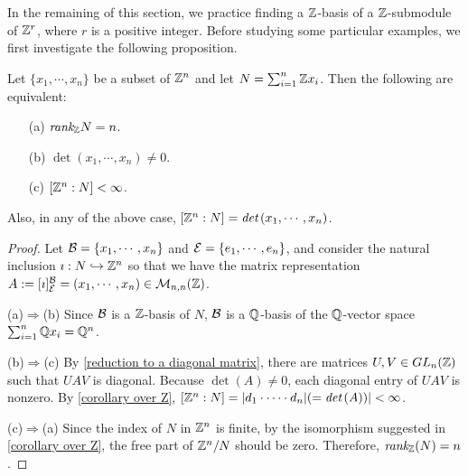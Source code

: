 In the remaining of this section, we practice finding a ${\mathbb{Z}}$-basis of a ${\mathbb{Z}}$-submodule of ${\mathbb{Z}}^r$, where $r$ is a positive integer.
Before studying some particular examples, we first investigate the following proposition.
\begin{prop}
    Let $\{x_1, \cdots, x_n\}$ be a subset of ${\mathbb{Z}}^n$ and let $N=\sum_{i=1}^n {\mathbb{Z}}x_i$.
    Then the following are equivalent:
    \begin{enumerate}
        \item[(a)]
        {
            $\textit{rank}_{\mathbb{Z}} N=n$.
        }
        \item[(b)]
        {
            $\det(x_1, \cdots, x_n)\neq 0$.
        }
        \item[(c)]
        {
            $[{\mathbb{Z}}^n: N]<\infty$.
        }
    \end{enumerate}
    Also, in any of the above case, $[{\mathbb{Z}}^n: N]=\textit{det\,}(x_1, \cdots, x_n)$.
\end{prop}
\begin{proof}
    Let ${\mathcal{B}}=\{x_1, \cdots, x_n\}$ and ${\mathcal{E}}=\{e_1, \cdots, e_n\}$, and consider the natural inclusion $\imath: N\hookrightarrow{\mathbb{Z}}^n$ so that we have the matrix representation $A:=[\imath]^{\mathcal{B}}_{\mathcal{E}}=(x_1, \cdots, x_n)\in{\mathcal{M}}_{n, n}({\mathbb{Z}})$.
    
    \hangindent=0.65cm
    \noindent(a)$\Rightarrow$(b)
    Since ${\mathcal{B}}$ is a ${\mathbb{Z}}$-basis of $N$, ${\mathcal{B}}$ is a ${\mathbb{Q}}$-basis of the ${\mathbb{Q}}$-vector space $\sum_{i=1}^n{\mathbb{Q}}x_i={\mathbb{Q}}^n$.

    \noindent(b)$\Rightarrow$(c)
    By \cref{reduction to a diagonal matrix}, there are matrices $U, V\in GL_n({\mathbb{Z}})$ such that $UAV$ is diagonal.
    Because $\det(A)\neq 0$, each diagonal entry of $UAV$ is nonzero.
    By \cref{corollary over Z}, $[{\mathbb{Z}}^n: N]=|d_1\cdot\cdots\cdot d_n|(=\textit{det\,}(A))|<\infty$.

    \noindent(c)$\Rightarrow$(a)
    Since the index of $N$ in ${\mathbb{Z}}^n$ is finite, by the isomorphism suggested in \cref{corollary over Z}, the free part of ${\mathbb{Z}}^n/N$ should be zero.
    Therefore, $\textit{rank}_{\mathbb{Z}}(N)=n$.
\end{proof}

